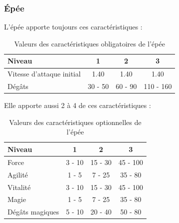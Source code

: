 \documentclass[11pt, a4paper, oneside]{report}
\begin{document}
\subsubsection{Épée}
L'épée apporte toujours ces caractéristiques :
\begin{table}[H]
\begin{center}
\begin{tabular}{| l | c | c | c |}
  \hline      
  Niveau 					& 1 & 2 & 3\\ \hline \hline                 
  Vitesse d'attaque initial	& 1.40 & 1.40 & 1.40\\ \hline
  Dégâts 					& 30 - 50 & 60 - 90 & 110 - 160\\ \hline
\end{tabular}
\caption{Valeurs des caractéristiques obligatoires de l'épée}
\end{center}
\end{table}
Elle apporte aussi 2 à 4 de ces caractéristiques :
\begin{table}[H]
\begin{center}
\begin{tabular}{| l | c | c | c |}
  \hline      
  Niveau 				& 1 & 2 & 3\\ \hline \hline                 
  Force 				& 3 - 10 & 15 - 30 & 45 - 100\\ \hline
  Agilité 				& 1 - 5 & 7 - 25 & 35 - 80\\ \hline
  Vitalité 				& 3 - 10 & 15 - 30 & 45 - 100\\ \hline
  Magie 				& 1 - 5 & 7 - 25 & 35 - 80\\ \hline
  Dégâts magiques 		& 5 - 10 & 20 - 40 & 50 - 80\\ \hline
\end{tabular}
\caption{Valeurs des caractéristiques optionnelles de l'épée}
\end{center}
\end{table}
\end{document}
